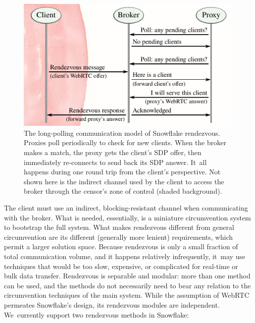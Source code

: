 \documentclass[letterpaper,twocolumn]{article}
\begin{document}
\begin{figure}
\includegraphics{figures/rendezvous/rendezvous}
\caption{
The long-polling communication model of Snowflake rendezvous.
Proxies poll periodically to check for new clients.
When the broker makes a match,
the proxy gets the client's SDP offer,
then immediately re-connects to send back its SDP answer.
It~all happens during one round trip from the client's perspective.
Not shown here is the indirect channel
used by the client to access the broker through the censor's zone of control
(shaded background).
}
\label{fig:rendezvous}
\end{figure}

The client must use an indirect,
blocking-resistant channel
when communicating with the broker.
What is needed, essentially,
is a miniature circumvention system
to bootstrap the full system.
What makes rendezvous
different from general circumvention
are its different (generally more lenient) requirements,
which permit a larger solution space.
Because rendezvous is only a small fraction
of total communication volume,
and it happens relatively infrequently,
it~may use techniques that would be
too slow, expensive, or complicated
for real-time or bulk data transfer.
Rendezvous is separable and modular:
more than one method can be used,
and the methods do not necessarily need to bear any relation
to the circumvention techniques of the main system.
While the assumption of WebRTC permeates Snowflake's design,
its rendezvous modules are independent.
We~currently support two rendezvous methods in Snowflake:
\end{document}
